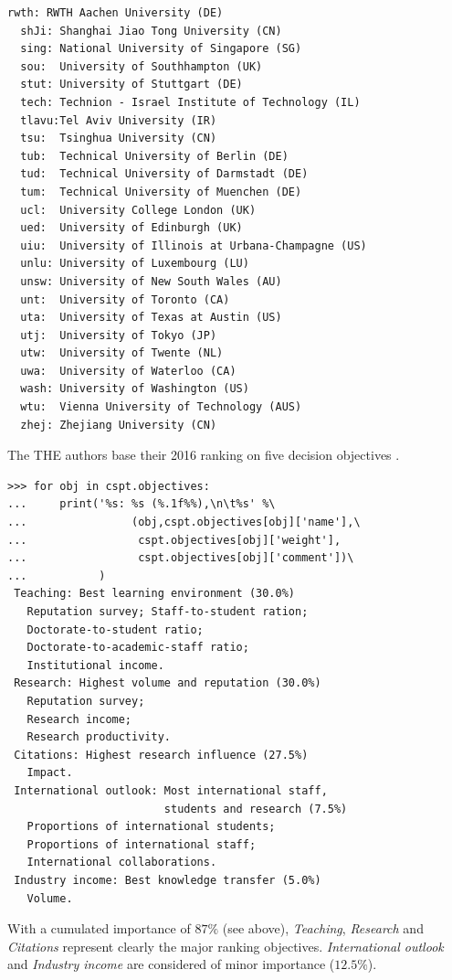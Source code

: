 \begin{lstlisting}[caption={Printing the CS Departments},label=list:13.2,basicstyle=\ttfamily\scriptsize]
  rwth:	RWTH Aachen University (DE)
  shJi:	Shanghai Jiao Tong University (CN)
  sing:	National University of Singapore (SG)
  sou:	University of Southhampton (UK)
  stut:	University of Stuttgart (DE)
  tech:	Technion - Israel Institute of Technology (IL)
  tlavu:Tel Aviv University (IR)
  tsu:	Tsinghua University (CN)
  tub:	Technical University of Berlin (DE)
  tud:	Technical University of Darmstadt (DE)
  tum:	Technical University of Muenchen (DE)
  ucl:	University College London (UK)
  ued:	University of Edinburgh (UK)
  uiu:	University of Illinois at Urbana-Champagne (US)
  unlu:	University of Luxembourg (LU)
  unsw:	University of New South Wales (AU)
  unt:	University of Toronto (CA)
  uta:	University of Texas at Austin (US)
  utj:	University of Tokyo (JP)
  utw:	University of Twente (NL)
  uwa:	University of Waterloo (CA)
  wash:	University of Washington (US)
  wtu:	Vienna University of Technology (AUS)
  zhej:	Zhejiang University (CN)
\end{lstlisting}

The THE authors base their 2016 ranking on five decision objectives \citep{THE-2016}.
\begin{lstlisting}[caption={The THE ranking objectives},label=list:13.3,basicstyle=\ttfamily\scriptsize]
>>> for obj in cspt.objectives:
...     print('%s: %s (%.1f%%),\n\t%s' %\
...                (obj,cspt.objectives[obj]['name'],\
...                 cspt.objectives[obj]['weight'],
...                 cspt.objectives[obj]['comment'])\
...           ) 
 Teaching: Best learning environment (30.0%)
   Reputation survey; Staff-to-student ration;
   Doctorate-to-student ratio;
   Doctorate-to-academic-staff ratio;
   Institutional income.
 Research: Highest volume and reputation (30.0%)
   Reputation survey;
   Research income;
   Research productivity.
 Citations: Highest research influence (27.5%)
   Impact.
 International outlook: Most international staff,
                        students and research (7.5%)
   Proportions of international students;
   Proportions of international staff;
   International collaborations.
 Industry income: Best knowledge transfer (5.0%)
   Volume.
\end{lstlisting}

With a cumulated importance of $87\%$ (see above), \emph{Teaching}, \emph{Research} and \emph{Citations} represent clearly the major ranking objectives. \emph{International outlook} and \emph{Industry income} are considered of minor importance ($12.5\%$).

